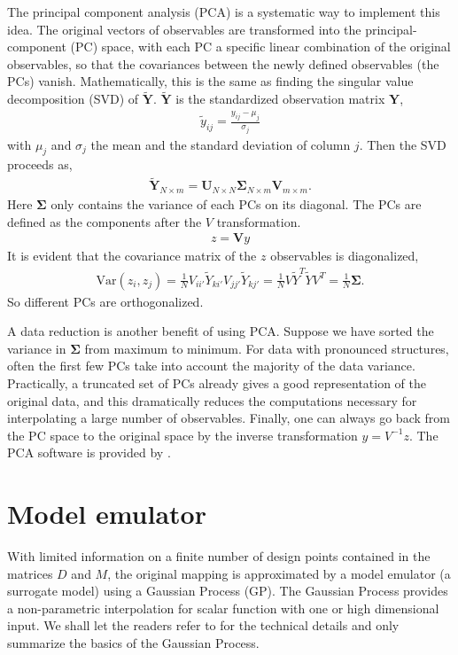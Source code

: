 The principal component analysis (PCA) is a systematic way to implement this idea.
The original vectors of observables are transformed into the principal-component (PC) space, with each PC a specific linear combination of the original observables, so that the covariances between the newly defined observables (the PCs) vanish.
Mathematically, this is the same as finding the singular value decomposition (SVD) of $\mathbf{\tilde{Y}}$. 
$\mathbf{\tilde{Y}}$ is the standardized observation matrix $\mathbf{Y}$,
\begin{eqnarray}
\tilde{y}_{ij} = \frac{y_{ij} - \mu_j}{\sigma_j}
\end{eqnarray}
with $\mu_j$ and $\sigma_j$ the mean and the standard deviation of column $j$.
Then the SVD proceeds as,
\begin{eqnarray}
\tilde{\mathbf{Y}}_{N\times m} = \mathbf{U}_{N\times N} \mathbf{\Sigma}_{N\times m} \mathbf{V}_{m\times m}.
\end{eqnarray}
Here $\mathbf{\Sigma}$ only contains the variance of each PCs on its diagonal.
The PCs are defined as the components after the $V$ transformation.
\begin{eqnarray}
z = \mathbf{V}y
\end{eqnarray}
It is evident that the covariance matrix of the $z$ observables is diagonalized,
\begin{eqnarray}
\mathrm{Var}(z_i, z_j) = \frac{1}{N}V_{ii'}\tilde{Y}_{ki'}V_{jj'}\tilde{Y}_{kj'} = \frac{1}{N}V\tilde{Y}^T\tilde{Y}V^T = \frac{1}{N}\mathbf{\Sigma}.
\end{eqnarray}
So different PCs are orthogonalized.

A data reduction is another benefit of using PCA.
Suppose we have sorted the variance in $\mathbf{\Sigma}$ from maximum to minimum.
For data with pronounced structures, often the first few PCs take into account the majority of the data variance.
Practically, a truncated set of PCs already gives a good representation of the original data, and this dramatically reduces the computations necessary for interpolating a large number of observables.
Finally, one can always go back from the PC space to the original space by the inverse transformation $y = V^{-1} z$.
The PCA software is provided by \cite{sklearn_api}.

\section{Model emulator}
With limited information on a finite number of design points contained in the matrices $D$ and $M$, the original mapping is approximated by a model emulator (a surrogate model) using a Gaussian Process (GP).
The Gaussian Process provides a non-parametric interpolation for scalar function with one or high dimensional input.
We shall let the readers refer to \cite{rasmussen2006gaussian} for the technical details and only summarize the basics of the Gaussian Process.

